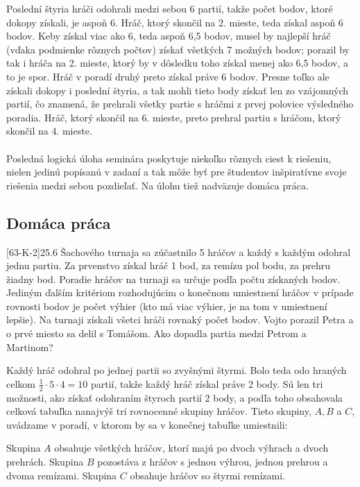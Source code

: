 \rieh Poslední štyria hráči odohrali medzi sebou 6 partií, takže počet bodov, ktoré dokopy získali, je aspoň 6. Hráč, ktorý skončil na 2. mieste, teda získal aspoň 6 bodov. Keby získal viac ako 6, teda aspoň 6,5 bodov, musel by najlepší hráč (vďaka podmienke rôznych počtov) získať všetkých 7 možných bodov; porazil by tak i hráča na 2. mieste, ktorý by v dôsledku toho získal menej ako 6,5 bodov, a to je spor. Hráč v poradí druhý preto získal práve 6 bodov. Presne toľko ale získali dokopy i poslední štyria, a tak mohli tieto body získať len zo vzájomných partií, čo znamená, že prehrali všetky partie s hráčmi z prvej polovice výsledného poradia. Hráč, ktorý skončil na 6. mieste, preto prehral partiu s hráčom, ktorý skončil na 4. mieste.\\
\\
\kom Posledná logická úloha seminára poskytuje niekoľko rôznych ciest k riešeniu, nielen jedinú popísanú v zadaní a tak môže byť pre študentov inšpiratívne svoje riešenia medzi sebou pozdieľať. Na úlohu tiež nadväzuje domáca práca.
\subsection*{Domáca práca}

\begin{tcolorbox}[breakable,notitle,boxrule=0pt,colback=light-gray,colframe=light-gray]\ul [63-K-2]{25.6}
Šachového turnaja sa zúčastnilo 5 hráčov a každý s každým odohral jednu partiu. Za prvenstvo získal hráč 1 bod, za remízu pol bodu, za prehru žiadny bod. Poradie hráčov na turnaji sa určuje podľa počtu získaných bodov. Jediným ďalším kritériom rozhodujúcim o konečnom umiestnení hráčov v prípade rovnosti bodov je počet výhier (kto má viac výhier, je na tom v umiestnení lepšie). Na turnaji získali všetci hráči rovnaký počet bodov. Vojto porazil Petra a o prvé miesto sa delil s Tomášom. Ako dopadla partia
medzi Petrom a Martinom?

\end{tcolorbox}

\rieh Každý hráč odohral po jednej partii so zvyšnými štyrmi. Bolo teda odo hraných celkom $\frac{1}{2}\cdot5 \cdot 4 = 10$ partií, takže každý hráč získal práve 2 body. Sú len tri možnosti, ako získať odohraním štyroch partií 2 body, a podľa toho obsahovala celková tabuľka nanajvýš tri rovnocenné skupiny hráčov. Tieto skupiny, $A, B$ a $C$, uvádzame v poradí, v ktorom by sa v konečnej tabuľke umiestnili:

Skupina $A$ obsahuje všetkých hráčov, ktorí majú po dvoch výhrach a dvoch prehrách. Skupina $B$ pozostáva z hráčov s jednou výhrou, jednou prehrou a dvoma remízami. Skupina $C$ obsahuje hráčov so štyrmi remízami.

